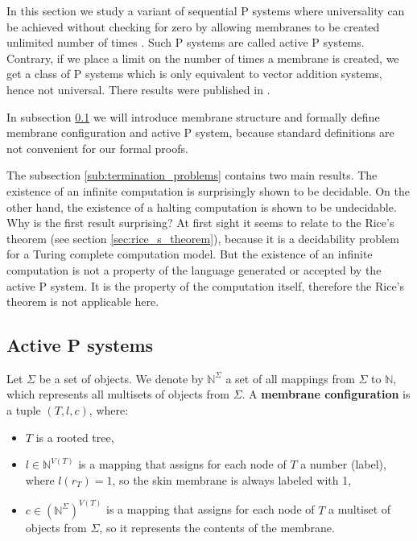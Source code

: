 In this section we study a variant of  sequential P systems where universality can be achieved without checking for zero by allowing membranes to be created unlimited number of times \cite{Ibarra05Active}. Such P systems are called active P systems. Contrary, if we place a limit on the number of times a membrane is created, we get a class of P systems which is only equivalent to vector addition systems, hence not universal. There results were published in \cite{Kovac15TerminationProblems}.

In subsection \ref{sub:active_p_systems} we will introduce membrane structure and formally define membrane configuration and active P system, because standard definitions are not convenient for our formal proofs.

The subsection \ref{sub:termination_problems} contains two main results. The existence of an infinite computation is surprisingly shown to be decidable. On the other hand, the existence of a halting computation is shown to be undecidable. Why is the first result surprising? At first sight it seems to relate to the Rice's theorem (see section \ref{sec:rice_s_theorem}), because it is a decidability problem for a Turing complete computation model. But the existence of an infinite computation is not a property of the language generated or accepted by the active P system. It is the property of the computation itself, therefore the  Rice's theorem is not applicable here.

\subsection{Active P systems} %
\label{sub:active_p_systems}

\begin{definition}
  \label{def:membrane_structure}
  Let $\Sigma$ be a set of objects. We denote by $\mathbb N^\Sigma$ a set of all mappings from $\Sigma$ to $\mathbb N$, which represents all multisets of objects from $\Sigma$. A  {\bf membrane configuration} is a tuple $(T, l, c)$, where:
  \begin{itemize}
    \item $T$ is a rooted tree,
    \item $l\in\mathbb N^{V(T)}$ is a mapping that assigns for each node of $T$ a number (label), where $l(r_T)=1$, so the skin membrane is always labeled with 1,
    \item $c\in(\mathbb N^\Sigma)^{V(T)}$ is a mapping that assigns for each node of $T$ a multiset of objects from $\Sigma$, so it represents the contents of the membrane.
  \end{itemize}
\end{definition}

